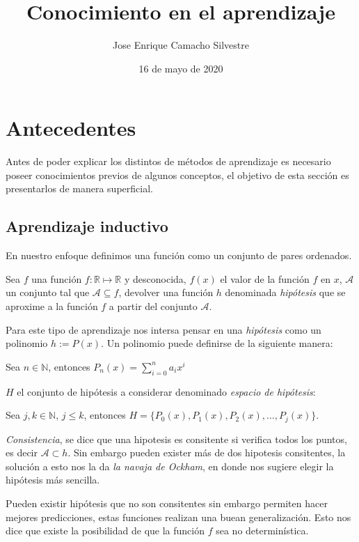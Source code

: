 \documentclass[12 pt, a4paper]{article}
\title{Conocimiento en el aprendizaje}
\author{Jose Enrique Camacho Silvestre}
\date{16 de mayo de 2020}
\begin{document}
	\maketitle
	\section{Antecedentes}
	Antes de poder explicar los distintos de métodos de aprendizaje es necesario poseer conocimientos previos de algunos conceptos, el objetivo de esta sección es presentarlos de manera superficial.
		\subsection{Aprendizaje inductivo}
			En nuestro enfoque definimos una función como un conjunto de pares ordenados.
			
			Sea \(f\) una función \(f: \mathbb{R} \mapsto \mathbb{R} \) y desconocida, \(f(x)\) el valor de la función \(f\) en \(x\), \(\mathcal{A}\) un conjunto tal que \(\mathcal{A} \subseteq f\),  devolver una función \(h\) denominada \emph{hipótesis} que se aproxime a la función \(f\) a partir del conjunto \(\mathcal{A}\). 
			
			Para este tipo de aprendizaje nos intersa pensar en una \emph{hipótesis} como un polinomio \(h := P(x)\). Un polinomio puede definirse de la siguiente manera:
			
			\begin{center}
				Sea \( n \in \mathbb{N}\), entonces \(P_{n}(x) =  \sum_{i = 0}^{n} a_{i}x^{i}\)
			\end{center}				
			\(H\) el conjunto de hipótesis a considerar denominado \emph{espacio de hipótesis}: 

			\begin{center}
				Sea \(j, k \in \mathbb{N}\),  \(j\leq k\), entonces \(H = \{ P_{0}(x), P_{1}(x), P_{2}(x), ... , P_{j}(x) \}\). 
			\end{center}
			
			\emph{Consistencia}, se dice que una hipotesis es consitente si verifica todos los puntos, es decir \(\mathcal{A} \subset h\). Sin embargo pueden exister más de dos hipotesis consitentes, la solución a esto nos la da \emph{la navaja de Ockham}, en donde nos sugiere elegir la hipótesis más sencilla.
			
			Pueden existir hipótesis que no son consitentes sin embargo permiten hacer mejores predicciones, estas funciones realizan una buean generalización. Esto nos dice que existe la posibilidad de que la función \(f\) sea no determinística.
			
\end{document}
